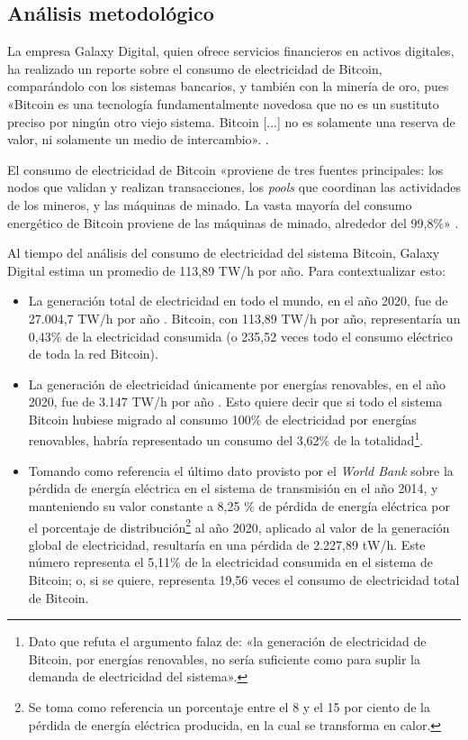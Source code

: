\documentclass[12pt,a4paper,twoside]{book}
\begin{document}
\subsection{Análisis metodológico}
La empresa Galaxy Digital, quien ofrece servicios financieros en activos digitales, ha realizado un reporte sobre el consumo de electricidad de Bitcoin, comparándolo con los sistemas bancarios, y también con la minería de oro, pues «Bitcoin es una tecnología fundamentalmente novedosa que no es un sustituto preciso por ningún otro viejo sistema. Bitcoin [...] no es solamente una reserva de valor, ni solamente un medio de intercambio». \cite[pág. 3]{galaxydigital}.

El consumo de electricidad de Bitcoin «proviene de tres fuentes principales: los nodos que validan y realizan transacciones, los \textit{pools} que coordinan las actividades de los mineros, y las máquinas de minado. La vasta mayoría del consumo energético de Bitcoin proviene de las máquinas de minado, alrededor del 99,8\%» \cite[pág. 3]{galaxydigital}.

Al tiempo del análisis del consumo de electricidad del sistema Bitcoin, Galaxy Digital estima un promedio de  113,89 TW/h por año. Para contextualizar esto:

\begin{itemize}
\item La generación total de electricidad en todo el mundo, en el año 2020, fue de 27.004,7 TW/h por año \cite[pág. 63]{bp}. Bitcoin, con 113,89 TW/h por año, representaría un 0,43\% de la electricidad consumida (o 235,52 veces todo el consumo eléctrico de toda la red Bitcoin).
\item La generación de electricidad únicamente por energías renovables, en el año 2020, fue de 3.147 TW/h por año \cite[pág. 56]{bp}. Esto quiere decir que si todo el sistema Bitcoin hubiese migrado al consumo 100\% de electricidad por energías renovables, habría representado un consumo del 3,62\% de la totalidad\footnote{Dato que refuta el argumento falaz de: «la generación de electricidad de Bitcoin, por energías renovables, no sería suficiente como para suplir la demanda de electricidad del sistema».}.
\item Tomando como referencia el último dato provisto por el \textit{World Bank} sobre la pérdida de energía eléctrica en el sistema de transmisión en el año 2014, y manteniendo su valor constante a 8,25 \% de pérdida de energía eléctrica por el porcentaje de distribución\footnote{Se toma como referencia un porcentaje entre el 8 y el 15 por ciento de la pérdida de energía eléctrica producida, en la cual se transforma en calor.} \cite{worldbank:electricidad} al año 2020, aplicado al valor de la generación global de electricidad, resultaría en una pérdida de 2.227,89 tW/h. Este número representa el 5,11\% de la electricidad consumida en el sistema de Bitcoin; o, si se quiere, representa 19,56 veces el consumo de electricidad total de Bitcoin.
\end{itemize}
\end{document}
